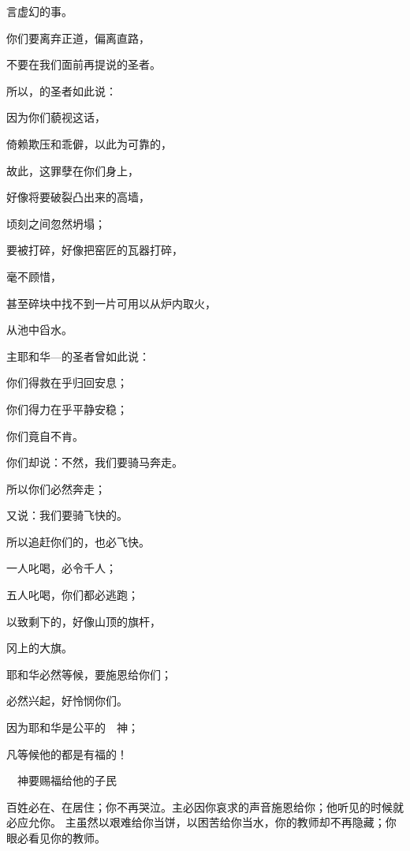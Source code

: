 {\par }{\Q 言虚幻的事。
\par }{\Q {}你们要离弃正道，偏离直路，
\par }{\Q 不要在我们面前再提说{}的圣者。
\par }{\Q {}所以，{}的圣者如此说：
\par }{\Q 因为你们藐视这{}话，
\par }{\Q 倚赖欺压和乖僻，以此为可靠的，
\par }{\Q {}故此，这罪孽在你们身上，
\par }{\Q 好像将要破裂凸出来的高墙，
\par }{\Q 顷刻之间忽然坍塌；
\par }{\Q {}要被打碎，好像把窑匠的瓦器打碎，
\par }{\Q 毫不顾惜，
\par }{\Q 甚至碎块中找不到一片可用以从炉内取火，
\par }{\Q 从池中舀水。
\par }{\BB \par }{\Q {}主耶和华—{}的圣者曾如此说：
\par }{\Q 你们得救在乎归回安息；
\par }{\Q 你们得力在乎平静安稳；
\par }{\Q 你们竟自不肯。
\par }{\Q {}你们却说：不然，我们要骑马奔走。
\par }{\Q 所以你们必然奔走；
\par }{\Q 又说：我们要骑飞快的{}。
\par }{\Q 所以追赶你们的，也必飞快。
\par }{\Q {}一人叱喝，必令千人{}；
\par }{\Q 五人叱喝，你们都必逃跑；
\par }{\Q 以致剩下的，好像山顶的旗杆，
\par }{\Q 冈上的大旗。
\par }{\Q {}耶和华必然等候，要施恩给你们；
\par }{\Q 必然兴起，好怜悯你们。
\par }{\Q 因为耶和华是公平的　神；
\par }{\Q 凡等候他的都是有福的！
\par }{\SH 　神要赐福给他的子民
\par }{\PP {}百姓必在{}、在{}居住；你不再哭泣。主必因你哀求的声音施恩给你；他听见的时候就必应允你。
主虽然以艰难给你当饼，以困苦给你当水，你的教师却不再隐藏；你眼必看见你的教师。
}
